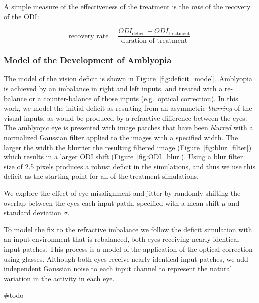 \documentclass[
]{article}
\begin{document}
A simple measure of the effectiveness of the treatment is the
\emph{rate} of the recovery of the ODI:

\[
\text{recovery rate}=\frac{ODI_{\text{deficit}}-ODI_{\text{treatment}}}{\text{duration of treatment}}
\]

\subsubsection{Model of the Development of
Amblyopia}\label{sec:model-of-the-development-of-amblyopia}

The model of the vision deficit is shown in
Figure~\ref{fig:deficit_model}. Amblyopia is achieved by an imbalance in
right and left inputs, and treated with a re-balance or a
counter-balance of those inputs (e.g.~optical correction). In this work,
we model the initial deficit as resulting from an asymmetric
\emph{blurring} of the visual inputs, as would be produced by a
refractive difference between the eyes. The amblyopic eye is presented
with image patches that have been \emph{blurred} with a normalized
Gaussian filter applied to the images with a specified width. The larger
the width the blurrier the resulting filtered image
(Figure~\ref{fig:blur_filter}) which results in a larger ODI shift
(Figure~\ref{fig:ODI_blur}). Using a blur filter size of 2.5 pixels
produces a robust deficit in the simulations, and thus we use this
deficit as the starting point for all of the treatment simulations.

We explore the effect of eye misalignment and jitter by randomly
shifting the overlap between the eyes each input patch, specified with a
mean shift \(\mu\) and standard deviation \(\sigma\).

To model the fix to the refractive imbalance we follow the deficit
simulation with an input environment that is rebalanced, both eyes
receiving nearly identical input patches. This process is a model of the
application of the optical correction using glasses. Although both eyes
receive nearly identical input patches, we add independent Gaussian
noise to each input channel to represent the natural variation in the
activity in each eye.

\#todo
\end{document}
